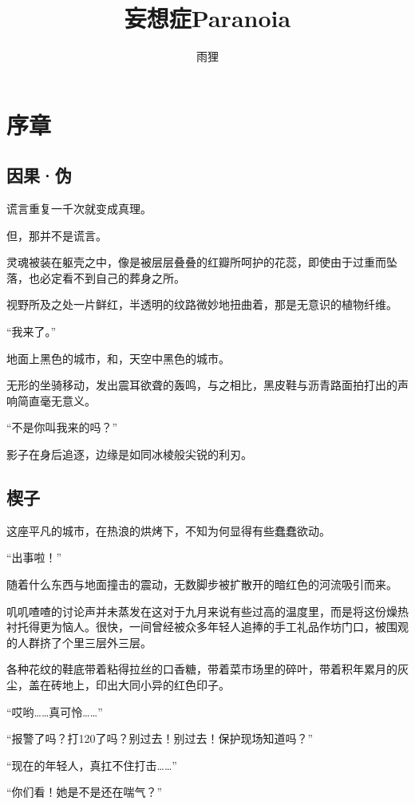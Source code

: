 \documentclass[UTF8, scheme = chinese, openany]{ctexbook}
\title{妄想症Paranoia}
\author{雨狸}
\date{}
\begin{document}
\maketitle
\tableofcontents 
\newpage

\chapter{序章}

\section{因果·伪}

谎言重复一千次就变成真理。

但，那并不是谎言。

灵魂被装在躯壳之中，像是被层层叠叠的红瓣所呵护的花蕊，即使由于过重而坠落，也必定看不到自己的葬身之所。

视野所及之处一片鲜红，半透明的纹路微妙地扭曲着，那是无意识的植物纤维。

“我来了。”

地面上黑色的城市，和，天空中黑色的城市。

无形的坐骑移动，发出震耳欲聋的轰鸣，与之相比，黑皮鞋与沥青路面拍打出的声响简直毫无意义。

“不是你叫我来的吗？”

影子在身后追逐，边缘是如同冰棱般尖锐的利刃。

\section{楔子}

这座平凡的城市，在热浪的烘烤下，不知为何显得有些蠢蠢欲动。

“出事啦！”

随着什么东西与地面撞击的震动，无数脚步被扩散开的暗红色的河流吸引而来。

叽叽喳喳的讨论声并未蒸发在这对于九月来说有些过高的温度里，而是将这份燥热衬托得更为恼人。很快，一间曾经被众多年轻人追捧的手工礼品作坊门口，被围观的人群挤了个里三层外三层。

各种花纹的鞋底带着粘得拉丝的口香糖，带着菜市场里的碎叶，带着积年累月的灰尘，盖在砖地上，印出大同小异的红色印子。

“哎哟……真可怜……”

“报警了吗？打120了吗？别过去！别过去！保护现场知道吗？”

“现在的年轻人，真扛不住打击……”

“你们看！她是不是还在喘气？”
\end{document}
